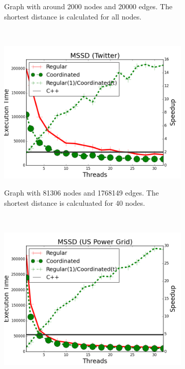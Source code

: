 \begin{figure}[]
\begin{subfigure}[b]{\plotsize\textwidth}
                \label{fig:coordination:coord_unbuffered_sssp_oclinks}
                \caption{Graph with around 2000 nodes and 20000 edges. The shortest
                   distance is calculated for all nodes.}
        \end{subfigure} \\
        \begin{subfigure}[b]{\plotsize\textwidth}
                \includegraphics[width=\textwidth]{experiments/coordination/unbuffered-shortest-twitter.png}
                \label{fig:coordination:coord_unbuffered_sssp_twitter}
                \caption{Graph with 81306 nodes and 1768149 edges. The shortest
                   distance is calculuated for 40 nodes.}
        \end{subfigure}
        ~
        \begin{subfigure}[b]{\plotsize\textwidth}
                \includegraphics[width=\textwidth]{experiments/coordination/unbuffered-shortest-uspowergrid.png}

\end{subfigure}
\end{figure}
